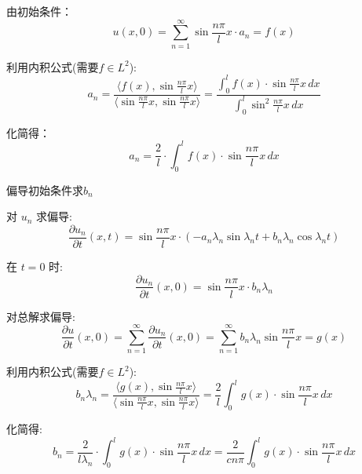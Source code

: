 \documentclass[a4paper, 12pt, oneside]{article} %
\numberwithin{subsection}{section}
\numberwithin{subsubsection}{subsection}
\theoremstyle{plain}
\theoremstyle{definition}
\theoremstyle{remark}
\begin{document}
		由初始条件：
		\begin{equation}
			u(x, 0) = \sum_{n=1}^{\infty} \sin \frac{n\pi}{l} x \cdot a_n = f(x)
		\end{equation}
		
		利用内积公式(需要$f \in L^2$):
		\begin{equation}
			a_n = \frac{\langle f(x), \sin \frac{n\pi}{l} x \rangle}{\langle \sin \frac{n\pi}{l} x, \sin \frac{n\pi}{l} x \rangle} = \frac{\int_0^l f(x) \cdot \sin \frac{n\pi}{l} x \, dx}{\int_0^l \sin^2 \frac{n\pi}{l} x \, dx}
		\end{equation}
		
		化简得：
		\begin{equation}
			a_n = \frac{2}{l} \cdot \int_0^l f(x) \cdot \sin \frac{n\pi}{l} x \, dx
		\end{equation}
		
		偏导初始条件求$b_n$
		
		对 \(u_n\) 求偏导:
		\begin{equation}
			\frac{\partial u_n}{\partial t}(x, t) = \sin \frac{n\pi}{l} x \cdot \left( -a_n \lambda_n \sin \lambda_n t + b_n \lambda_n \cos \lambda_n t \right)
		\end{equation}
		
		在 \(t = 0\) 时:
		\begin{equation}
			\frac{\partial u_n}{\partial t}(x, 0) = \sin \frac{n\pi}{l} x \cdot b_n \lambda_n
		\end{equation}
		
		对总解求偏导:
		\begin{equation}
			\frac{\partial u}{\partial t}(x, 0) = \sum_{n=1}^{\infty} \frac{\partial u_n}{\partial t}(x, 0) = \sum_{n=1}^{\infty} b_n \lambda_n \sin \frac{n\pi}{l} x = g(x)
		\end{equation}
		
		利用内积公式(需要$f \in L^2$):
		\begin{equation}
			b_n \lambda_n = \frac{\langle g(x), \sin \frac{n\pi}{l} x \rangle}{\langle \sin \frac{n\pi}{l} x, \sin \frac{n\pi}{l} x \rangle} = \frac{2}{l} \int_0^l g(x) \cdot \sin \frac{n\pi}{l} x \, dx
		\end{equation}
		
		化简得:
		\begin{equation}
			b_n = \frac{2}{l \lambda_n} \cdot \int_0^l g(x) \cdot \sin \frac{n\pi}{l} x \, dx = \frac{2}{c n \pi} \int_0^l g(x) \cdot \sin \frac{n\pi}{l} x \, dx
		\end{equation}
		
\end{document}
